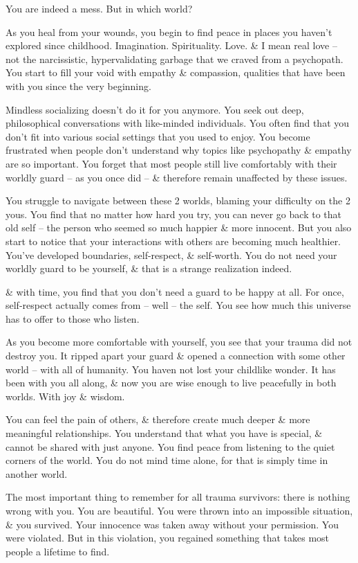\documentclass{article}
\numberwithin{equation}{section}
\begin{document}
You are indeed a mess. But in which world?

As you heal from your wounds, you begin to find peace in places you haven't explored since childhood. Imagination. Spirituality. Love. \& I mean real love -- not the narcissistic, hypervalidating garbage that we craved from a psychopath. You start to fill your void with empathy \& compassion, qualities that have been with you since the very beginning.

Mindless socializing doesn't do it for you anymore. You seek out deep, philosophical conversations with like-minded individuals. You often find that you don't fit into various social settings that you used to enjoy. You become frustrated when people don't understand why topics like psychopathy \& empathy are so important. You forget that most people still live comfortably with their worldly guard -- as you once did -- \& therefore remain unaffected by these issues.

You struggle to navigate between these 2 worlds, blaming your difficulty on the 2 yous. You find that no matter how hard you try, you can never go back to that old self -- the person who seemed so much happier \& more innocent. But you also start to notice that your interactions with others are becoming much healthier. You've developed boundaries, self-respect, \& self-worth. You do not need your worldly guard to be yourself, \& that is a strange realization indeed.

\& with time, you find that you don't need a guard to be happy at all. For once, self-respect actually comes from -- well -- the self. You see how much this universe has to offer to those who listen.

As you become more comfortable with yourself, you see that your trauma did not destroy you. It ripped apart your guard \& opened a connection with some other world -- with all of humanity. You haven not lost your childlike wonder. It has been with you all along, \& now you are wise enough to live peacefully in both worlds. With joy \& wisdom.

You can feel the pain of others, \& therefore create much deeper \& more meaningful relationships. You understand that what you have is special, \& cannot be shared with just anyone. You find peace from listening to the quiet corners of the world. You do not mind time alone, for that is simply time in another world.

The most important thing to remember for all trauma survivors: there is nothing wrong with you. You are beautiful. You were thrown into an impossible situation, \& you survived. Your innocence was taken away without your permission. You were violated. But in this violation, you regained something that takes most people a lifetime to find.
\end{document}
